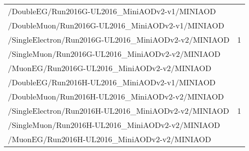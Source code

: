 \begin{table}[h]
\begin{tabular}{|lc|}
        \hline
        /DoubleEG/Run2016G-UL2016\_MiniAODv2-v1/MINIAOD & \multirow{5}{*}{1} \\ %
        /DoubleMuon/Run2016G-UL2016\_MiniAODv2-v1/MINIAOD	& \\
        /SingleElectron/Run2016G-UL2016\_MiniAODv2-v2/MINIAOD	& \\
        /SingleMuon/Run2016G-UL2016\_MiniAODv2-v2/MINIAOD	& \\
        /MuonEG/Run2016G-UL2016\_MiniAODv2-v2/MINIAOD	& \\
        \hline
        /DoubleEG/Run2016H-UL2016\_MiniAODv2-v1/MINIAOD & \multirow{5}{*}{1} \\ %
        /DoubleMuon/Run2016H-UL2016\_MiniAODv2-v2/MINIAOD	& \\
        /SingleElectron/Run2016H-UL2016\_MiniAODv2-v2/MINIAOD	& \\
        /SingleMuon/Run2016H-UL2016\_MiniAODv2-v2/MINIAOD	& \\
        /MuonEG/Run2016H-UL2016\_MiniAODv2-v2/MINIAOD	& \\
        \hline
		\end{tabular}
	\label{table:2016_dataSamples_dilep}
\end{table}
